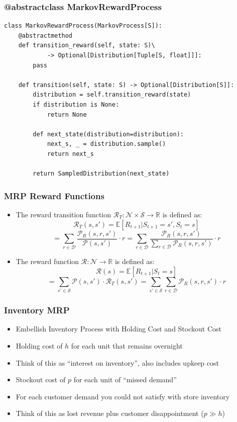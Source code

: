 \documentclass[handout]{beamer}
\begin{document}
\begin{frame}[fragile]
\frametitle{@abstractclass MarkovRewardProcess}
\pause
\begin{lstlisting}
class MarkovRewardProcess(MarkovProcess[S]):
    @abstractmethod
    def transition_reward(self, state: S)\
            -> Optional[Distribution[Tuple[S, float]]]:
        pass
        
    def transition(self, state: S) -> Optional[Distribution[S]]:
        distribution = self.transition_reward(state)
        if distribution is None:
            return None

        def next_state(distribution=distribution):
            next_s, _ = distribution.sample()
            return next_s

        return SampledDistribution(next_state)    
\end{lstlisting}
\end{frame}

\begin{frame}
\frametitle{MRP Reward Functions}
\pause
\begin{itemize}[<+->]
\item The reward transition function $\mathcal{R}_T: \mathcal{N} \times \mathcal{S} \rightarrow \mathbb{R}$ is defined as:
$$\mathcal{R}_T(s,s') = \mathbb{E}[R_{t+1}|S_{t+1}=s',S_t=s]$$
$$ = \sum_{r\in \mathcal{D}} \frac {\mathcal{P}_R(s,r,s')} {\mathcal{P}(s,s')} \cdot r = \sum_{r\in \mathcal{D}} \frac {\mathcal{P}_R(s,r,s')} {\sum_{r\in \mathcal{D}} \mathcal{P}_R(s,r,s')} \cdot r$$
\item The reward function $\mathcal{R}: \mathcal{N} \rightarrow \mathbb{R}$ is defined as:
$$\mathcal{R}(s) = \mathbb{E}[R_{t+1}|S_t=s]$$
$$ = \sum_{s' \in \mathcal{S}} \mathcal{P}(s,s') \cdot \mathcal{R}_T(s,s') = \sum_{s'\in \mathcal{S}} \sum_{r \in \mathcal{D}} \mathcal{P}_R(s,r,s') \cdot r$$
\end{itemize}
\end{frame}

\begin{frame}
\frametitle{Inventory MRP}
\pause
\begin{itemize}[<+->]
\item Embellish Inventory Process with Holding Cost and Stockout Cost
\item Holding cost of $h$ for each unit that remains overnight
\item Think of this as ``interest on inventory'', also includes upkeep cost
\item Stockout cost of $p$ for each unit of ``missed demand''
\item For each customer demand you could not satisfy with store inventory
\item Think of this as lost revenue plus customer disappointment ($p \gg h$)
\end{itemize}
\end{frame}
\end{document}
